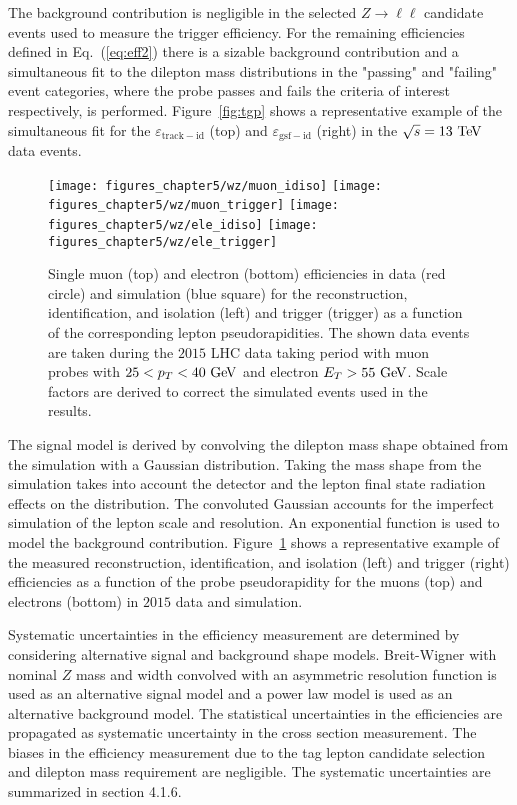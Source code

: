 The background contribution is negligible in the selected $Z \rightarrow \ell\ell$ candidate events used to measure the trigger efficiency. For the remaining efficiencies defined in Eq.~(\ref{eq:eff2}) there is a sizable background contribution and a simultaneous fit to the dilepton mass distributions in the "passing" and "failing" event categories, where the probe passes and fails the criteria of interest respectively, is performed. Figure~\ref{fig:tgp} shows a representative example of the simultaneous fit for the $\varepsilon_{\mathrm{track-id}}$ (top) and $\varepsilon_{\mathrm{gsf-id}}$ (right) in the $\sqrt{s}=13~\mathrm{Te\kern -0.1em V}$ data events.     
\begin{figure}[h]
\centering
\texttt{[image: figures\_chapter5/wz/muon\_idiso]}
\texttt{[image: figures\_chapter5/wz/muon\_trigger]}
\texttt{[image: figures\_chapter5/wz/ele\_idiso]}
\texttt{[image: figures\_chapter5/wz/ele\_trigger]}
\caption{Single muon (top) and electron (bottom) efficiencies in data (red circle) and simulation (blue square) for the reconstruction, identification, and isolation (left) and trigger (trigger) as a function of the corresponding lepton pseudorapidities. The shown data events are taken during the $2015$ LHC data taking period with muon probes with $25<p_{T}<40~\mathrm{Ge\kern -0.1em V}$ and electron $E_{T}>55~\mathrm{Ge\kern -0.1em V}$. Scale factors are derived to correct the simulated events used in the results.}
\label{fig:eff_fit}
\end{figure}
The signal model is derived by convolving the dilepton mass shape obtained from the simulation with a Gaussian distribution. Taking the mass shape from the simulation takes into account the detector and the lepton final state radiation effects on the distribution. The convoluted Gaussian accounts for the imperfect simulation of the lepton scale and resolution. An exponential function is used to model the background contribution. Figure~\ref{fig:eff_fit} shows a representative example of the measured reconstruction, identification, and isolation (left) and trigger (right) efficiencies as a function of the probe pseudorapidity for the muons (top) and electrons (bottom) in $2015$ data and simulation.

Systematic uncertainties in the efficiency measurement are determined by considering alternative signal and background shape models. Breit-Wigner with nominal $Z$ mass and width convolved with an asymmetric resolution function is used as an alternative signal model and a power law model is used as an alternative background model. The statistical uncertainties in the efficiencies are propagated as systematic uncertainty in the cross section measurement. The biases in the efficiency measurement due to the tag lepton candidate selection and dilepton mass requirement are negligible. The systematic uncertainties are summarized in section 4.1.6.    

